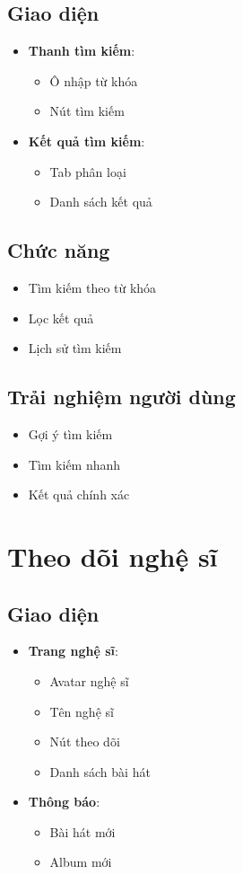 \documentclass{article}
\begin{document}
\subsection{Giao diện}
\begin{itemize}
    \item \textbf{Thanh tìm kiếm}:
    \begin{itemize}
        \item Ô nhập từ khóa
        \item Nút tìm kiếm
    \end{itemize}
    \item \textbf{Kết quả tìm kiếm}:
    \begin{itemize}
        \item Tab phân loại
        \item Danh sách kết quả
    \end{itemize}
\end{itemize}

\subsection{Chức năng}
\begin{itemize}
    \item Tìm kiếm theo từ khóa
    \item Lọc kết quả
    \item Lịch sử tìm kiếm
\end{itemize}

\subsection{Trải nghiệm người dùng}
\begin{itemize}
    \item Gợi ý tìm kiếm
    \item Tìm kiếm nhanh
    \item Kết quả chính xác
\end{itemize}

\section{Theo dõi nghệ sĩ}
\subsection{Giao diện}
\begin{itemize}
    \item \textbf{Trang nghệ sĩ}:
    \begin{itemize}
        \item Avatar nghệ sĩ
        \item Tên nghệ sĩ
        \item Nút theo dõi
        \item Danh sách bài hát
    \end{itemize}
    \item \textbf{Thông báo}:
    \begin{itemize}
        \item Bài hát mới
        \item Album mới
    \end{itemize}
\end{itemize}
\end{document}
